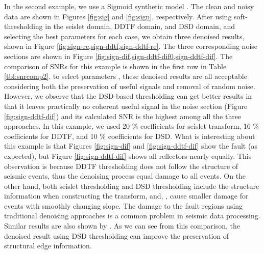 In the second example, we use a Sigmoid synthetic model  \cite[]{claerbout2010bei}. The clean and noisy data are shown in Figures \ref{fig:sig} and \ref{fig:sign}, respectively. After using soft-thresholding in the seislet domain, DDTF domain, and DSD domain, and selecting the best parameters for each case, we obtain three denoised results, shown in Figure \ref{fig:sign-re,sign-ddtf,sign-ddtf-re}.  The three corresponding noise sections are shown in Figure \ref{fig:sign-dif,sign-ddtf-dif0,sign-ddtf-dif}. The comparison of SNRs for this example is shown in the first row in Table \ref{tbl:snrcomp2}.  to select  parameters , these denoised results are all acceptable considering both the preservation of useful signals and removal of random noise. However, we observe that the DSD-based thresholding can get better results in that it leaves practically no coherent useful signal in the noise section (Figure \ref{fig:sign-ddtf-dif}) and its calculated SNR is the highest among all the three approaches. In this example, we used 20 \% coefficients for seislet transform, 16 \% coefficients for DDTF, and 10 \% coefficients for DSD.   What is interesting about this example is that Figures \ref{fig:sign-dif} and \ref{fig:sign-ddtf-dif} show the fault (as expected), but Figure \ref{fig:sign-ddtf-dif} shows all reflectors nearly equally. This observation is  because DDTF thresholding does not follow the structure of seismic events, thus the denoising process   equal damage to all events. On the other hand, both seislet thresholding and DSD thresholding include the structure information when constructing the transform, and, , cause smaller damage for events with smoothly changing slope. The damage to the fault regions using traditional denoising approaches is a common problem in seismic data processing. Similar results are also shown by \cite{liuyang2010}. As we can see from this comparison, the denoised result using DSD thresholding can improve the preservation of structural edge information.

